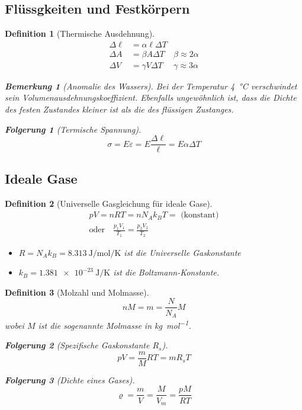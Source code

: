 \documentclass[a4paper, twocolumn]{article}
\numberwithin{equation}{section}
\theoremstyle{hsr-def}
\newtheorem{definition}{Definition}[section]
\theoremstyle{hsr-sub}
\newtheorem{result}{Folgerung}[definition]
\newtheorem{remark}{Bemerkung}[definition]
\begin{document}
\subsection{Fl\"ussgkeiten und Festk\"orpern}
\begin{definition}[Thermische Ausdehnung]
\begin{align*}
    \Delta \ell &= \alpha\ell\Delta T \\
    \Delta A &= \beta A \Delta T & \beta \approx 2\alpha \\
    \Delta V &= \gamma V \Delta T & \gamma \approx 3\alpha
\end{align*}

\begin{remark}[Anomalie des Wassers] Bei der Temperatur \SI{4}{\celsius} verschwindet sein Volumenausdehnungskoeffizient. Ebenfalls ungew\"ohnlich ist, dass die Dichte des festen Zustandes kleiner ist als die des fl\"ussigen Zustanges.
\end{remark}

\begin{result}[Termische Spannung]
\[
    \sigma = E\varepsilon = E\frac{\Delta \ell}{\ell} = E \alpha \Delta T
\]
\end{result}
\end{definition}

\subsection{Ideale Gase}
\begin{definition}[Universelle Gasgleichung f\"ur ideale Gase]
\begin{gather*}
    pV = nRT = n N_A k_B T = \text{ (konstant)} \\
    \text{oder} \quad \frac{p_1 V_1}{T_1} = \frac{p_2 V_2}{T_2}
\end{gather*}
\begin{itemize}
    \item \(R = N_A k_B = \SI{8.313}{\joule\per\mole\per\kelvin}\) ist die Universelle Gaskonstante
    \item \(k_B = \SI{1.381e-23}{\joule\per\kelvin}\) ist die Boltzmann-Konstante.
\end{itemize}
\end{definition}

\begin{definition}[Molzahl und Molmasse]
\[
    nM = m = \frac{N}{N_A} M
\]
wobei \(M\) ist die sogenannte Molmasse in \si{\kilo\gram\per\mole}.

\begin{result}[Spezifische Gaskonstante \(R_s\)]
\[
    pV = \frac{m}{M} RT = m R_s T
\]
\end{result}

\begin{result}[Dichte eines Gases]
\[
    \varrho = \frac{m}{V} = \frac{M}{V_m} = \frac{pM}{RT}
\]
\end{result}
\end{definition}
\end{document}

